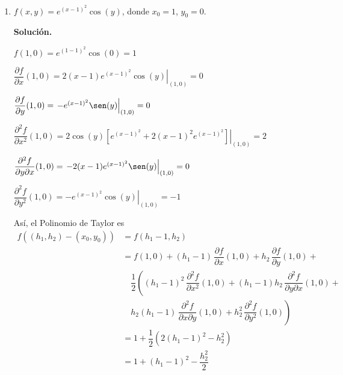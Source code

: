 \documentclass[fleqn, 12pt]{article}
\newcommand{\derivadaparcial}[2]{\dfrac{\partial {#1}}{\partial {#2}}}
\newcommand{\derivadaparcialn}[3]{\dfrac{\partial^{#3} {#1}}{\partial {#2}^{#3}}}
\newcommand{\derivadaparcialnd}[3]{\dfrac{\partial^{2} {#1}}{\partial {#3} \partial {#2}}}
\begin{document}
\begin{enumerate}
        \item $ f(x,y) = e^{(x - 1)^2} \cos (y) $, donde $ x_0 = 1 $, $ y_0 = 0 $.
        
        \textbf{Solución.}

        $ f(1,0) = e^{(1 - 1)^2} \cos (0) = 1 $

        $ \derivadaparcial{f}{x} (1,0) = \left. 2(x - 1) e^{(x - 1)^2} \cos (y) \right|_{(1,0)} = 0 $

        $ \derivadaparcial{f}{y} (1,0) = \left. -e^{(x - 1)^2} \sen (y) \right|_{(1,0)} = 0 $

        $ \derivadaparcialn{f}{x}{2} (1,0) = \left. 2 \cos (y) \left[ e^{(x - 1)^2} + 2(x - 1)^2 e^{(x - 1)^2} \right] \right|_{(1,0)} = 2 $

        $ \derivadaparcialnd{f}{x}{y} (1,0) = \left. -2(x - 1) e^{(x - 1)^2} \sen (y) \right|_{(1,0)} = 0 $

        $ \derivadaparcialn{f}{y}{2} (1,0) = \left. -e^{(x - 1)^2} \cos (y) \right|_{(1,0)} = -1 $

        Así, el Polinomio de Taylor es
        \begin{align*}
            f((h_1, h_2) - (x_0, y_0)) &= f(h_1 - 1, h_2) \\
            &= f(1,0) + (h_1 - 1) \, \derivadaparcial{f}{x} (1,0) + h_2 \, \derivadaparcial{f}{y} (1,0) + \\
            & \quad \dfrac{1}{2} \left( (h_1 - 1)^2 \, \derivadaparcialn{f}{x}{2} (1,0) + (h_1 - 1) h_2 \, \derivadaparcialnd{f}{x}{y} (1,0) \right. + \\
            & \quad \left. h_2 (h_1 - 1) \, \derivadaparcialnd{f}{y}{x} (1,0) + h_2^2 \, \derivadaparcialn{f}{y}{2} (1,0) \right) \\
            &= 1 + \dfrac{1}{2} \left( 2(h_1 - 1)^2 - h_2^2 \right) \\
            &= 1 + (h_1 - 1)^2 - \dfrac{h_2^2}{2}
        \end{align*}
    \end{enumerate}
\end{document}
